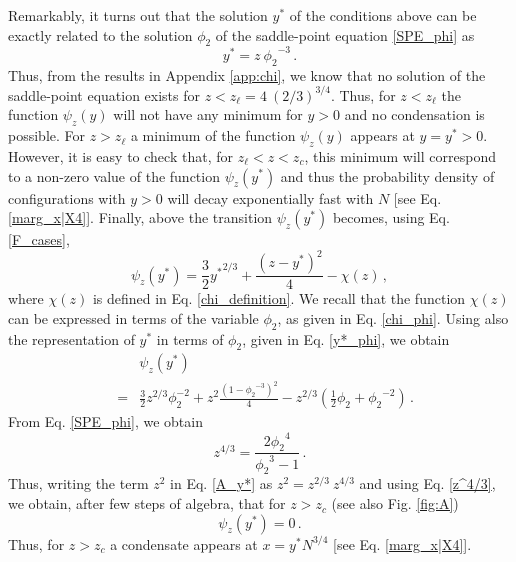 \documentclass[aps,pre,twocolumn,superscriptaddress,showpacs]{revtex4-1}
\newcommand{\be}{\begin{equation}}
\newcommand{\ee}{\end{equation}}
\begin{document}
Remarkably, it turns out that the solution $y^*$ of the conditions above can be exactly related to the solution $\phi_2$ of the saddle-point equation \eqref{SPE_phi} as
\begin{equation}
y^*=z~ {\phi_2}^{-3}\,.
\label{y*_phi}
\end{equation}
Thus, from the results in Appendix \ref{app:chi}, we know that no solution of the saddle-point equation exists for $z<z_{\ell}=4~(2/3)^{3/4}$. Thus, for $z<z_{\ell}$ the function $\psi_z(y)$ will not have any minimum for $y>0$ and no condensation is possible. For $z>z_{\ell}$ a minimum of the function $\psi_z(y)$ appears at $y=y^*>0$. However, it is easy to check that, for $z_{\ell}<z<z_c$, this minimum will correspond to a non-zero value of the function $\psi_z(y^*)$ and thus the probability density of configurations with $y>0$ will decay exponentially fast with $N$ [see Eq. \eqref{marg_x|X4}]. Finally, above the transition $\psi_z(y^*)$ becomes, using Eq. \eqref{F_cases},
\be 
\psi_z(y^*)=\frac32 {y^*}^{2/3}+\frac{(z-y^*)^2}{4}-\chi(z)\,,
\ee
where $\chi(z)$ is defined in Eq. \eqref{chi_definition}. We recall that the function $\chi(z)$ can be expressed in terms of the variable $\phi_2$, as given in Eq. \eqref{chi_phi}. Using also the representation of $y^*$ in terms of $\phi_2$, given in Eq. \eqref{y*_phi}, we obtain
\begin{eqnarray}
&&\psi_z(y^*)\\
&=&\frac32 {z}^{2/3} \phi_2^{-2}+z^2 \frac{(1-{\phi_2}^{-3})^2}{4}-z^{2/3}\left(\frac12 \phi_2 +{\phi_2}^{-2}\right)\,. \nonumber
\label{A_y*}
\end{eqnarray} 
From Eq. \eqref{SPE_phi}, we obtain
\begin{equation}
z^{4/3}=\frac{2{\phi_2}^{4}}{{\phi_2}^3-1}\,.
\label{z^4/3}
\end{equation}
Thus, writing the term $z^2$ in Eq. \eqref{A_y*} as $z^2=z^{2/3}~z^{4/3}$ and using Eq. \eqref{z^4/3}, we obtain, after few steps of algebra, that for $z>z_c$ (see also Fig. \ref{fig:A})
\begin{equation}
\psi_z(y^*)=0\,.
\end{equation}
Thus, for $z>z_c$ a condensate appears at $x=y^*N^{3/4}$ [see Eq. \eqref{marg_x|X4}]. 
\end{document}
